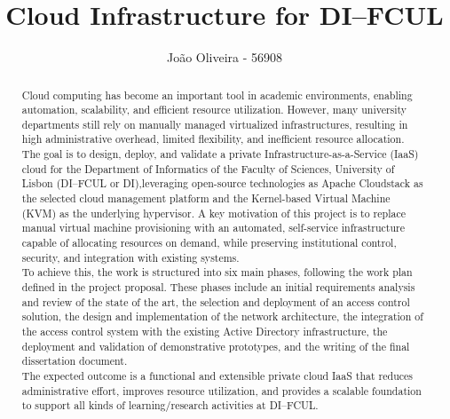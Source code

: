 \documentclass[sigplan]{acmart}
\begin{document}
\title{Cloud Infrastructure for DI–FCUL} 

\author{João Oliveira - 56908}


\begin{abstract}
Cloud computing has become an important tool in academic environments, enabling automation, scalability, and efficient resource utilization. However, many university departments still rely on manually managed virtualized infrastructures, resulting in high administrative overhead, limited flexibility, and inefficient resource allocation.\\

The goal is to design, deploy, and validate a private Infrastructure-as-a-Service (IaaS) cloud for the Department of Informatics of the Faculty of Sciences, University of Lisbon (DI–FCUL or DI),leveraging open-source technologies as Apache Cloudstack as the selected cloud management platform and the Kernel-based Virtual Machine (KVM) as the underlying hypervisor. A key motivation of this project is to replace manual virtual machine provisioning with an automated, self-service infrastructure capable of allocating resources on demand, while preserving institutional control, security, and integration with existing systems.\\

To achieve this, the work is structured into six main phases, following the work plan defined in the project proposal. These phases include an initial requirements analysis and review of the state of the art, the selection and deployment of an access control solution, the design and implementation of the network architecture, the integration of the access control system with the existing Active Directory infrastructure, the deployment and validation of demonstrative prototypes, and the writing of the final dissertation document.\\

The expected outcome is a functional and extensible private cloud IaaS that reduces administrative effort, improves resource utilization, and provides a scalable foundation to support all kinds of learning/research activities at DI–FCUL.
\end{abstract}


\end{document}
